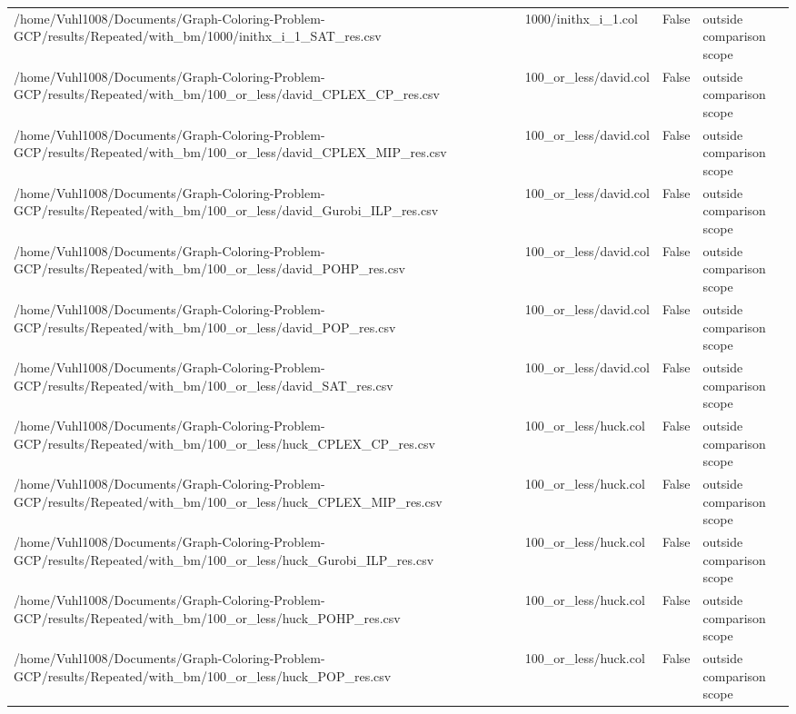 \begin{table}[htbp]
\begin{tabular}{llll}
/home/Vuhl1008/Documents/Graph-Coloring-Problem-GCP/results/Repeated/with\_bm/1000/inithx\_i\_1\_SAT\_res.csv & 1000/inithx\_i\_1.col & False & outside comparison scope \\
/home/Vuhl1008/Documents/Graph-Coloring-Problem-GCP/results/Repeated/with\_bm/100\_or\_less/david\_CPLEX\_CP\_res.csv & 100\_or\_less/david.col & False & outside comparison scope \\
/home/Vuhl1008/Documents/Graph-Coloring-Problem-GCP/results/Repeated/with\_bm/100\_or\_less/david\_CPLEX\_MIP\_res.csv & 100\_or\_less/david.col & False & outside comparison scope \\
/home/Vuhl1008/Documents/Graph-Coloring-Problem-GCP/results/Repeated/with\_bm/100\_or\_less/david\_Gurobi\_ILP\_res.csv & 100\_or\_less/david.col & False & outside comparison scope \\
/home/Vuhl1008/Documents/Graph-Coloring-Problem-GCP/results/Repeated/with\_bm/100\_or\_less/david\_POHP\_res.csv & 100\_or\_less/david.col & False & outside comparison scope \\
/home/Vuhl1008/Documents/Graph-Coloring-Problem-GCP/results/Repeated/with\_bm/100\_or\_less/david\_POP\_res.csv & 100\_or\_less/david.col & False & outside comparison scope \\
/home/Vuhl1008/Documents/Graph-Coloring-Problem-GCP/results/Repeated/with\_bm/100\_or\_less/david\_SAT\_res.csv & 100\_or\_less/david.col & False & outside comparison scope \\
/home/Vuhl1008/Documents/Graph-Coloring-Problem-GCP/results/Repeated/with\_bm/100\_or\_less/huck\_CPLEX\_CP\_res.csv & 100\_or\_less/huck.col & False & outside comparison scope \\
/home/Vuhl1008/Documents/Graph-Coloring-Problem-GCP/results/Repeated/with\_bm/100\_or\_less/huck\_CPLEX\_MIP\_res.csv & 100\_or\_less/huck.col & False & outside comparison scope \\
/home/Vuhl1008/Documents/Graph-Coloring-Problem-GCP/results/Repeated/with\_bm/100\_or\_less/huck\_Gurobi\_ILP\_res.csv & 100\_or\_less/huck.col & False & outside comparison scope \\
/home/Vuhl1008/Documents/Graph-Coloring-Problem-GCP/results/Repeated/with\_bm/100\_or\_less/huck\_POHP\_res.csv & 100\_or\_less/huck.col & False & outside comparison scope \\
/home/Vuhl1008/Documents/Graph-Coloring-Problem-GCP/results/Repeated/with\_bm/100\_or\_less/huck\_POP\_res.csv & 100\_or\_less/huck.col & False & outside comparison scope \\

\end{tabular}
\end{table}

